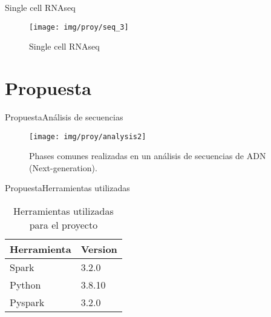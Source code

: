 \documentclass[10pt]{beamer}
\newcommand{\1}{
        	\setbeamertemplate{background}{
        		\texttt{[image: img/1]}
        		\tikz[overlay] \fill[fill opacity=0.75,fill=white] (0,0) rectangle (-\paperwidth,\paperheight);
        	}
}
\begin{document}
\begin{frame}{Single cell RNAseq}{}
	\begin{figure}[H]
		\centering
		\texttt{[image: img/proy/seq\_3]}
		\caption{Single cell RNAseq}
	\end{figure}
\end{frame}


\section{Propuesta}

\begin{frame}{Propuesta}{Análisis de secuencias}
	\begin{figure}[H]
		\centering
		\texttt{[image: img/proy/analysis2]}
		\caption{Phases comunes realizadas en un análisis de secuencias de ADN (Next-generation).}
		\label{fig:analysis}
	\end{figure}	
\end{frame}

\begin{frame}{Propuesta}{Herramientas utilizadas}
\begin{table}[H]
	\centering
	\caption{Herramientas utilizadas para el proyecto}
	\label{tab:tools}
	\begin{tabular}{ll}
		\textbf{Herramienta} & \textbf{Version}
		\\ \hline
		Spark       & 3.2.0   \\
		Python      & 3.8.10  \\
		Pyspark     & 3.2.0  
	\end{tabular}
\end{table}	
\end{frame}
\end{document}
